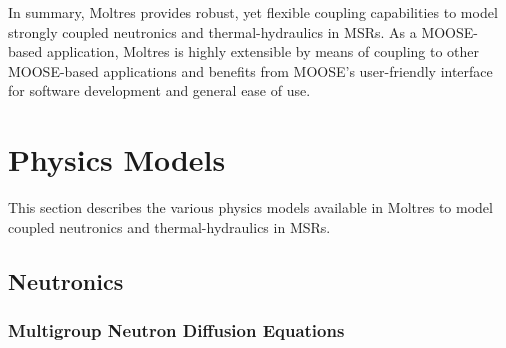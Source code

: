 In summary, Moltres provides robust, yet flexible coupling capabilities to
model strongly coupled neutronics and thermal-hydraulics in \glspl{MSR}. As a
MOOSE-based application, Moltres is highly extensible by means of coupling to
other MOOSE-based applications and benefits from MOOSE's user-friendly
interface for software development and general ease of use.

\section{Physics Models} \label{sec:moltres-physics}

This section describes the various physics models available in Moltres to model
coupled neutronics and thermal-hydraulics in \glspl{MSR}.

\subsection{Neutronics}

\subsubsection{Multigroup Neutron Diffusion Equations}

